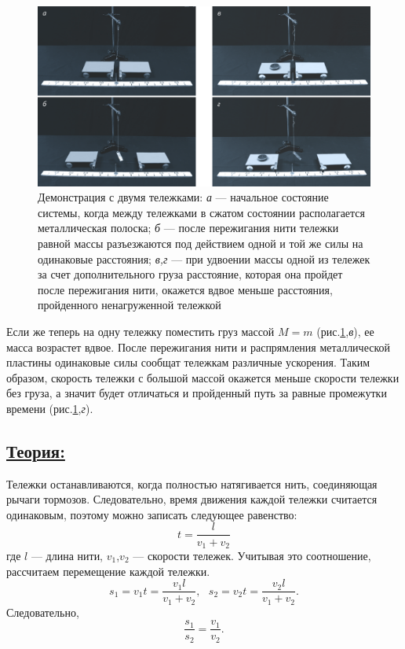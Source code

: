 \documentclass[14pt,a4paper,oneside]{extarticle}	%
\begin{document}
\begin{figure}[H]
	\centering
	\includegraphics[width=1\linewidth]{newton-2.png}
	\caption{Демонстрация с двумя тележками: \textit{а} — начальное состояние системы, когда между тележками в сжатом состоянии располагается металлическая полоска; \textit{б} — после пережигания нити тележки равной массы разъезжаются под действием одной и той же силы на одинаковые расстояния; \textit{в,г} — при удвоении массы одной из тележек за счет дополнительного груза расстояние, которая она пройдет после пережигания нити, окажется вдвое меньше расстояния, пройденного ненагруженной тележкой}
	\label{newton-2}
\end{figure}

Если же теперь на одну тележку поместить груз массой  $ M = m $ (рис.\ref{newton-2},\textit{в}), ее масса возрастет вдвое.
После пережигания нити и распрямления металлической пластины одинаковые силы сообщат тележкам различные ускорения.
Таким образом, скорость тележки с большой массой окажется меньше скорости тележки без груза, а значит будет отличаться и пройденный путь за равные промежутки времени (рис.\ref{newton-2},\textit{г}).

\newpage
\subsection*{\underline{Теория:}}

Тележки останавливаются, когда полностью натягивается нить, соединяющая рычаги тормозов. 
Следовательно, время движения каждой тележки считается одинаковым, поэтому можно записать следующее равенство:
\begin{equation}\label{newton-eq1}
 t = \frac{l}{v_{1} + v_{2}}
\end{equation}
где $ l $ — длина нити, $ v_{1} $,$ v_{2} $ — скорости тележек. 
Учитывая это соотношение, рассчитаем перемещение каждой тележки.
 \begin{equation}\label{newton-eq2}
 s_{1} = v_{1}t = \frac{v_{1}l}{v_{1} + v_{2}}, \text{   }
  s_{2} = v_{2}t = \frac{v_{2}l}{v_{1} + v_{2}}.
 \end{equation}
 Следовательно,
  \begin{equation}\label{newton-eq3}
 \frac{s_{1}}{s_{2}} = \frac{v_{1}}{v_{2}}.
 \end{equation}
 
\end{document}
